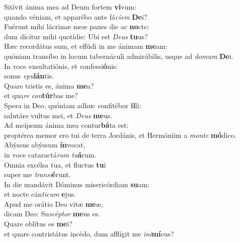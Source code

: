 \evenverse Sitívit ánima mea ad Deum fortem \textbf{vi}vum:~\*\\
\evenverse quando véniam, et apparébo ante fá\textit{ci}\textit{em} \textbf{De}i?\\
\oddverse Fuérunt mihi lácrimæ meæ panes die ac \textbf{no}cte:~\*\\
\oddverse dum dícitur mihi quotídie: Ubi est \textit{De}\textit{us} \textbf{tu}us?\\
\evenverse Hæc recordátus sum, et effúdi in me ánimam \textbf{me}am:~\*\\
\evenverse quóniam transíbo in locum tabernáculi admirábilis, usque ad \textit{do}\textit{mum} \textbf{De}i.\\
\oddverse In voce exsultatiónis, et confessi\textbf{ó}nis:~\*\\
\oddverse sonus \textit{e}\textit{pu}\textbf{lán}tis.\\
\evenverse Quare tristis es, ánima \textbf{me}a?~\*\\
\evenverse et qua\textit{re} \textit{con}\textbf{túr}bas me?\\
\oddverse Spera in Deo, quóniam adhuc confitébor \textbf{il}li:~\*\\
\oddverse salutáre vultus mei, et \textit{De}\textit{us} \textbf{me}us.\\
\evenverse Ad meípsum ánima mea contur\textbf{bá}ta est:~\*\\
\evenverse proptérea memor ero tui de terra Jordánis, et Hermóniim a \textit{mon}\textit{te} \textbf{mó}dico.\\
\oddverse Abýssus abýssum \textbf{ín}vocat,~\*\\
\oddverse in voce cataractá\textit{rum} \textit{tu}\textbf{á}rum.\\
\evenverse Omnia excélsa tua, et fluctus \textbf{tu}i~\*\\
\evenverse super me \textit{tran}\textit{si}\textbf{é}runt.\\
\oddverse In die mandávit Dóminus misericórdiam \textbf{su}am:~\*\\
\oddverse et nocte cán\textit{ti}\textit{cum} \textbf{e}jus.\\
\evenverse Apud me orátio Deo vitæ \textbf{me}æ,~\*\\
\evenverse dicam Deo: Su\textit{scép}\textit{tor} \textbf{me}us es.\\
\oddverse Quare oblítus es \textbf{me}i?~\*\\
\oddverse et quare contristátus incédo, dum afflígit me \textit{i}\textit{ni}\textbf{mí}cus?\\
